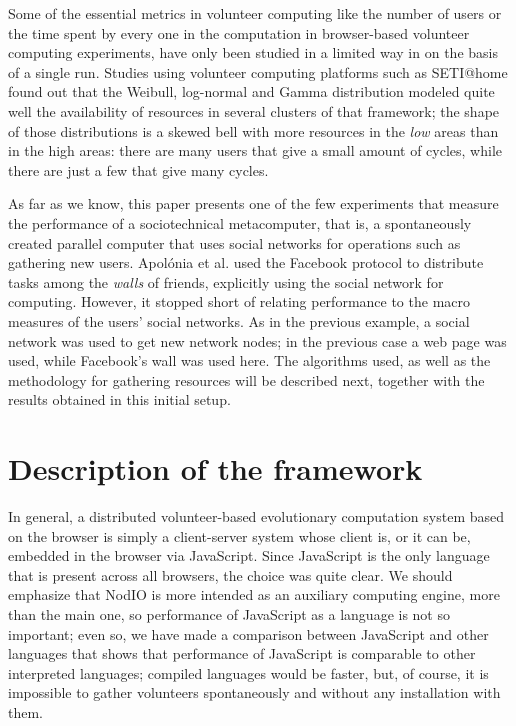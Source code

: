 \documentclass[letterpaper]{article}
\begin{document}
Some of the essential metrics in volunteer computing like the
number of users or the time spent by every one in the
computation in browser-based volunteer computing experiments, have
only been studied in a limited way in 
\citep{DBLP:journals/gpem/LaredoBGVAGF14} on the basis of a single
run. Studies using volunteer computing platforms such as SETI@home
\citep{javadi2009mining,agajaj} found out that the Weibull, log-normal and
Gamma distribution 
modeled quite well the availability of resources in several clusters
of that framework; the shape of those distributions is a skewed bell
with more resources in the {\em low} areas than in the high areas:
there are many users that give a small amount of cycles, while there
are just a few that give many cycles. 

As far as we know, this paper presents one of the few experiments
that measure the performance of a sociotechnical
metacomputer, that is, a spontaneously created parallel computer that
uses social networks for operations such as gathering new
users. Apol{\'o}nia et al. \citep{apolonia2012enhancing} used the 
Facebook protocol to distribute tasks among the {\em walls} of
friends, explicitly using the social network for computing. However,
it stopped short of relating performance to the macro measures of the
users' social networks. As in the previous example, a social network
was used to get new network nodes; in the previous case a web page was
used, while Facebook's wall was used here.
The algorithms used, as well as the methodology 
for gathering resources will be described next, 
together with the results obtained in this initial setup.


\section{Description of the framework}
\label{sec:description}

In general, a distributed volunteer-based evolutionary computation
system based on the browser is simply a client-server system
whose client is, or it can be, embedded in the browser via
JavaScript. Since JavaScript is  the only language that is present
across all browsers, the choice was quite clear. We should emphasize
that NodIO is more intended as an auxiliary computing engine, more
than the main one, so performance of JavaScript as a language is not
so important; even so, we have made a comparison between JavaScript and other languages
\citep{2015arXiv151101088M} that shows that performance of JavaScript
is comparable to other interpreted languages; compiled languages would
be faster, but, of course, it is impossible to gather volunteers
spontaneously and without any installation with them.
\end{document}
